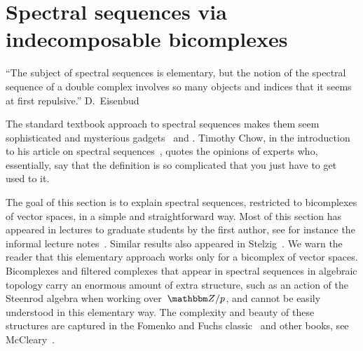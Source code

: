 \documentclass[10pt,a4paper]{amsart}
\theoremstyle{definition}
\numberwithin{equation}{section}
\def\Z{{\mathbbm Z}}
\begin{document}
\section{Spectral sequences via indecomposable bicomplexes} \label{secbicomplex}

\begin{flushright}
\parbox{3.5in}{\small ``The subject of spectral sequences is elementary,
 but the notion of the spectral sequence of a double complex involves so many
objects and indices that it seems at first repulsive.'' D.~Eisenbud~\cite[Appendix 3.13]{Eisenbud}}
\end{flushright}

The standard textbook approach to spectral sequences makes them seem sophisticated and mysterious gadgets~\cite{CE, GM, McCleary,Weibel, W} and \cite[Appendix 3.13]{Eisenbud}.
Timothy Chow, in the introduction to his article on spectral sequences~\cite{Chow},
quotes the opinions of experts who, essentially, say that the definition is so complicated that you just have to get used to it.

The goal of this section is to explain spectral sequences, restricted to
bicomplexes of vector spaces, in a simple and straightforward way. Most of this section has appeared in lectures to graduate students by the first author, see for instance the informal lecture notes~\cite{Kh-2010}. Similar results also appeared in Stelzig~\cite{St-2018}. We warn the reader that this elementary approach works only for a bicomplex of vector spaces. Bicomplexes and filtered complexes that appear in spectral sequences in algebraic topology carry an enormous amount of extra structure, such as an action of the Steenrod algebra when working over~$\Z/p$, and cannot be easily understood in this elementary way. The complexity and beauty of these structures are captured in the Fomenko and Fuchs classic~\cite{FF} and other books, see McCleary~\cite{McCleary}.
\end{document}
